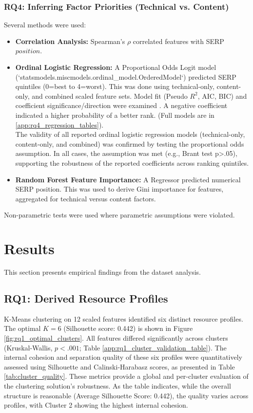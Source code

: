 \documentclass[a4paper,fleqn]{cas-sc}
\begin{document}
\subsubsection{RQ4: Inferring Factor Priorities (Technical vs. Content)}
\label{subsubsec:analysis_rq4}
Several methods were used:
\begin{itemize}
\item \textbf{Correlation Analysis:} Spearman's $\rho$ correlated features with SERP $position$.
\item \textbf{Ordinal Logistic Regression:} A Proportional Odds Logit model (`statsmodels.miscmodels.ordinal\_model.OrderedModel`) predicted SERP quintiles (0=best to 4=worst). This was done using technical-only, content-only, and combined scaled feature sets. Model fit (Pseudo $R^2$, AIC, BIC) and coefficient significance/direction were examined \citep{Nagpal2021, Toms2004}. A negative coefficient indicated a higher probability of a better rank. (Full models are in \ref{app:rq4_regression_tables}). \\
The validity of all reported ordinal logistic regression models (technical-only, content-only, and combined) was confirmed by testing the proportional odds assumption. In all cases, the assumption was met (e.g., Brant test p>.05), supporting the robustness of the reported coefficients across ranking quintiles.
\item \textbf{Random Forest Feature Importance:} A Regressor predicted numerical SERP position. This was used to derive Gini importance for features, aggregated for technical versus content factors.
\end{itemize}
Non-parametric tests were used where parametric assumptions were violated.

\section{Results}
\label{sec:results}
This section presents empirical findings from the dataset analysis.

\subsection{RQ1: Derived Resource Profiles}
\label{subsec:results_rq1}
K-Means clustering on 12 scaled features identified six distinct resource profiles. The optimal $K=6$ (Silhouette score: \num{0.442}) is shown in Figure \ref{fig:rq1_optimal_clusters}. All features differed significantly across clusters (Kruskal-Wallis, $p < .001$; Table \ref{app:rq1_cluster_validation_table}). The internal cohesion and separation quality of these six profiles were quantitatively assessed using Silhouette and Calinski-Harabasz scores, as presented in Table \ref{tab:cluster_quality}. These metrics provide a global and per-cluster evaluation of the clustering solution's robustness. As the table indicates, while the overall structure is reasonable (Average Silhouette Score: 0.442), the quality varies across profiles, with Cluster 2 showing the highest internal cohesion.
\end{document}
